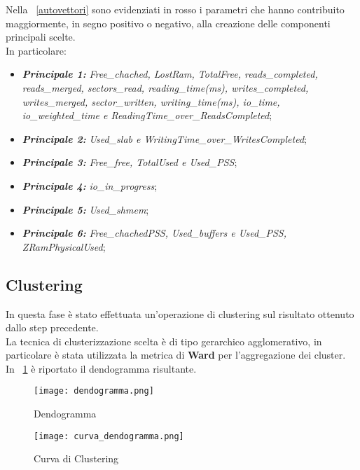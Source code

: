 Nella \figurename~\ref{autovettori} sono evidenziati in rosso i parametri che
hanno contribuito maggiormente, in segno positivo o negativo, alla creazione
delle componenti principali scelte.\\
In particolare:
\begin{itemize}
  \item \textbf{\textit{Principale 1:}} \textit{Free\_chached, LostRam, TotalFree,
  reads\_completed, reads\_merged, sectors\_read, reading\_time(ms),
  writes\_completed, writes\_merged, sector\_written, writing\_time(ms),
  io\_time, io\_weighted\_time e ReadingTime\_over\_ReadsCompleted};
  \item \textbf{\textit{Principale 2:}} \textit{Used\_slab e WritingTime\_over\_WritesCompleted};
  \item \textbf{\textit{Principale 3:}} \textit{Free\_free, TotalUsed e Used\_PSS};
  \item \textbf{\textit{Principale 4:}} \textit{io\_in\_progress};
  \item \textbf{\textit{Principale 5:}} \textit{Used\_shmem};
  \item \textbf{\textit{Principale 6:}} \textit{Free\_chachedPSS, Used\_buffers e Used\_PSS, ZRamPhysicalUsed};
\end{itemize}

\subsection{Clustering}
In questa fase è stato effettuata un'operazione di clustering sul risultato
ottenuto dallo step precedente.\\
La tecnica di clusterizzazione scelta è di tipo gerarchico agglomerativo,
in particolare è stata utilizzata la metrica di \textbf{Ward} per l'aggregazione
dei cluster.\\
In \figurename~\ref{dendogramma} è riportato il dendogramma risultante.\\

\begin{figure}[!htbp]
	\texttt{[image: dendogramma.png]}
  \caption{Dendogramma}
  \label{dendogramma}
\end{figure}

\begin{figure}[!htbp]
	\texttt{[image: curva\_dendogramma.png]}
  \caption{Curva di Clustering}
  \label{curva_dendogramma}
\end{figure}


